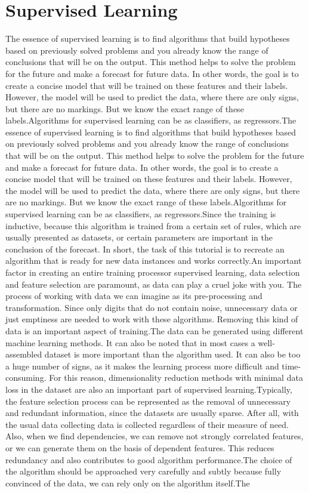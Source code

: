 \section{Supervised Learning}\label{sec:3.5}
\par The essence of supervised learning is to find algorithms that build hypotheses based on previously solved problems and you already know the range of conclusions that will be on the output. This method helps to solve the problem for the future and make a forecast for future data. In other words, the goal is to create a concise model that will be trained on these features and their labels. However, the model will be used to predict the data, where there are only signs, but there are no markings. But we know the exact range of these labels.Algorithms for supervised learning can be as classifiers, as regressors.The essence of supervised learning is to find algorithms that build hypotheses based on previously solved problems and you already know the range of conclusions that will be on the output. This method helps to solve the problem for the future and make a forecast for future data. In other words, the goal is to create a concise model that will be trained on these features and their labels. However, the model will be used to predict the data, where there are only signs, but there are no markings. But we know the exact range of these labels.Algorithms for supervised learning can be as classifiers, as regressors.Since the training is inductive, because this algorithm is trained from a certain set of rules, which are usually presented as datasets, or certain parameters are important in the conclusion of the forecast. In short, the task of this tutorial is to recreate an algorithm that is ready for new data instances and works correctly.An important factor in creating an entire training processor supervised learning, data selection and feature selection are paramount, as data can play a cruel joke with you. The process of working with data we can imagine as its pre-processing and transformation. Since only digits that do not contain noise, unnecessary data or just emptiness are needed to work with these algorithms. Removing this kind of data is an important aspect of training.The data can be generated using different machine learning methods. It can also be noted that in most cases a well-assembled dataset is more important than the algorithm used. It can also be too a huge number of signs, as it makes the learning process more difficult and time-consuming. For this reason, dimensionality reduction methods with minimal data loss in the dataset are also an important part of supervised learning.Typically, the feature selection process can be represented as the removal of unnecessary and redundant information, since the datasets are usually sparse. After all, with the usual data collecting data is collected regardless of their measure of need. Also, when we find dependencies, we can remove not strongly correlated features, or we can generate them on the basis of dependent features. This reduces redundancy and also contributes to good algorithm performance.The choice of the algorithm should be approached very carefully and subtly because fully convinced of the data, we can rely only on the algorithm itself.The 